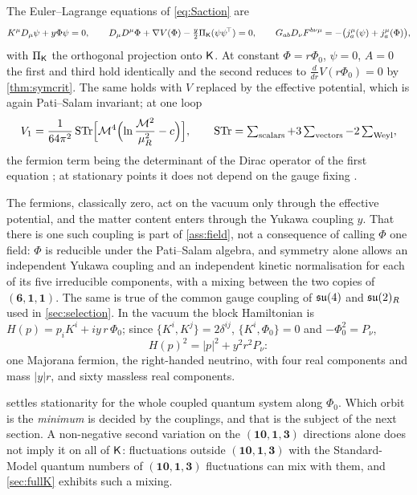 \begin{proposition}
\label{prop:coupled3}
The Euler--Lagrange equations of \eqref{eq:Saction} are
\[
K^\mu D_\mu\psi+y\Phi\psi=0,\qquad D_\mu D^\mu\Phi+\nabla V(\Phi)-\tfrac y2\Pi_\mathsf K(\psi\psi^{\!\top})=0,\qquad G_{ab}D_\nu F^{b\nu\mu}=-\bigl(j^\mu_a(\psi)+j^\mu_a(\Phi)\bigr),
\]
with $\Pi_\mathsf K$ the orthogonal projection onto $\mathsf K$. At constant $\Phi=r\Phi_0$, $\psi=0$, $A=0$ the first and third hold identically and the second
reduces to $\tfrac{d}{dr}V(r\Phi_0)=0$ by \cref{thm:symcrit}. The same holds with $V$ replaced by the effective potential, which is again
Pati--Salam invariant; at one loop
\begin{equation}
\label{eq:V1}
V_1=\frac1{64\pi^2}\,\mathrm{STr}\Bigl[\mathcal M^4\Bigl(\ln\frac{\mathcal M^2}{\mu_R^2}-c\Bigr)\Bigr],\qquad
\mathrm{STr}=\textstyle\sum_{\rm scalars}+3\sum_{\rm vectors}-2\sum_{\rm Weyl},
\end{equation}
the fermion term being the determinant of the Dirac operator of the first equation \cite{ColemanWeinberg73,Jackiw74}; at stationary points it
does not depend on the gauge fixing \cite{Nielsen75}.
\end{proposition}

The fermions, classically zero, act on the vacuum only through the effective potential, and the matter content enters through the Yukawa
coupling $y$. That there is one such coupling is part of \cref{ass:field}, not a consequence of calling $\Phi$ one field: $\Phi$ is reducible under the
Pati--Salam algebra, and symmetry alone allows an independent Yukawa coupling and an independent kinetic normalisation for each of its five irreducible
components, with a mixing between the two copies of $(\mathbf6,\mathbf1,\mathbf1)$. The same is true of the common gauge coupling of $\mathfrak{su}(4)$ and $\mathfrak{su}(2)_R$ used in
\cref{sec:selection}. In the vacuum the block Hamiltonian is $H(p)=p_iK^i+iy\,r\,\Phi_0$; since $\{K^i,K^j\}=2\delta^{ij}$,
$\{K^i,\Phi_0\}=0$ and $-\Phi_0^2=P_\nu$,
\[
H(p)^2=|p|^2+y^2r^2P_\nu :
\]
one Majorana fermion, the right-handed neutrino, with four real components and mass $|y|r$, and sixty massless real components.

 settles stationarity for the whole coupled quantum system along $\Phi_0$. Which orbit is the \emph{minimum} is decided by the
couplings, and that is the subject of the next section. A non-negative second variation on the $(\mathbf{10},\mathbf1,\mathbf3)$ directions alone does not
imply it on all of $\mathsf K$: fluctuations outside $(\mathbf{10},\mathbf1,\mathbf3)$ with the Standard-Model quantum numbers of $(\mathbf{10},\mathbf1,\mathbf3)$ fluctuations can
mix with them, and \cref{sec:fullK} exhibits such a mixing.
